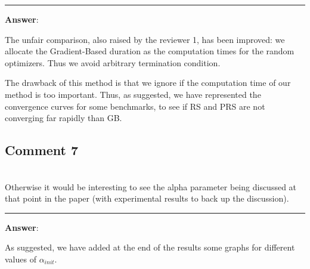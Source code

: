 \documentclass{scrartcl}
\begin{document}
\rule{\linewidth}{.1pt}
\textbf{Answer}:

The unfair comparison, also raised by the reviewer 1, has been improved: we allocate the Gradient-Based duration as the computation times for the random optimizers. Thus we avoid arbitrary termination condition.

The drawback of this method is that we ignore if the computation time of our method is too important. Thus, as suggested, we have represented the convergence curves for some benchmarks, to see if RS and PRS are not converging far rapidly than GB.

\subsection{Comment 7}
\hrulefill\\

Otherwise it would be interesting to see the alpha parameter being discussed at that point in the paper (with experimental results to back up the discussion).

\rule{\linewidth}{.1pt}
\textbf{Answer}:

As suggested, we have added at the end of the results some graphs for different values of $\alpha_{init}$.
\end{document}
